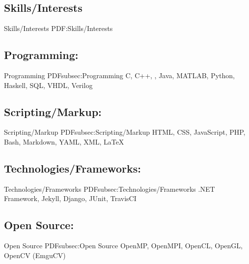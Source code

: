 \documentclass[a4paper,10pt,oneside]{article}
\begin{document}
\begin{body}





\section
{Skills/Interests}
{Skills/Interests}
{PDF:Skills/Interests}
\subsection
{Programming:}
{Programming}
{PDFsubsec:Programming}
C, C++, \Csharp, Java, MATLAB, Python, Haskell, SQL, VHDL, Verilog
\vspace{15pt}
\subsection
{Scripting/Markup:}
{Scripting/Markup}
{PDFsubsec:Scripting/Markup}
HTML, CSS, JavaScript, PHP, Bash, Markdown, YAML, XML, \LaTeX
\vspace{15pt}
\subsection
{Technologies/Frameworks:}
{Technologies/Frameworks}
{PDFsubsec:Technologies/Frameworks}
.NET Framework, Jekyll, Django, JUnit, TravisCI
\vspace{15pt}
\subsection
{Open Source:}
{Open Source}
{PDFsubsec:Open Source}
OpenMP, OpenMPI, OpenCL, OpenGL, OpenCV (EmguCV)
\vspace{15pt}

\end{body}
\end{document}
